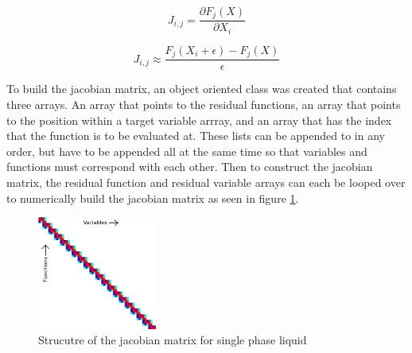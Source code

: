     \begin{equation}
    	\label{eq:jac_def}
    	J_{i,j}=\frac{ \partial F_{j}(X)}{\partial X_{i}}
    \end{equation}
    
    \begin{equation}
    	\label{eq:jac_numerical}
    	J_{i,j}  \approx \frac{F_{j}(X_{i}+\epsilon)-F_{j}(X)}{\epsilon}
    \end{equation}
    
    To build the jacobian matrix, an object oriented class was created that
    contains three arrays. An array that points to the residual functions, an
    array that points to the position within a target variable arrray, and an
    array that has the index that the function is to be evaluated at. These
    lists can be appended to in any order, but have to be appended all at the
    same time so that variables and functions must correspond with each other.
    Then to construct the jacobian matrix, the residual function and residual
    variable arrays can each be looped over to numerically build the jacobian
    matrix as seen in figure \ref{fig:Jacobian_Setup}. 
    
    \begin{figure}[!h]
    	\centering
    	\includegraphics[width=0.35\textwidth]{images/Jacobian_Setup}
    	\caption{Strucutre of the jacobian matrix for single phase liquid}
    	\label{fig:Jacobian_Setup}
    \end{figure}


